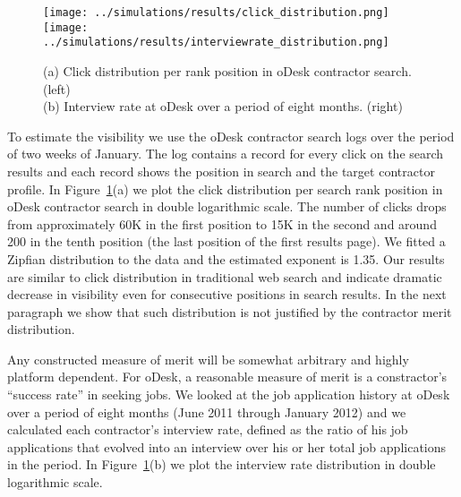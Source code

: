 \documentclass[prodmode,acmec]{acmsmall}
\begin{document}
%
%
\begin{figure}[t]
  \texttt{[image: ../simulations/results/click\_distribution.png]}
  \texttt{[image: ../simulations/results/interviewrate\_distribution.png]}
  \caption{(a) Click distribution per rank position in oDesk contractor
    search. (left)\\ (b) Interview rate at oDesk over a period of eight months. (right)}
  \label{fig:clicks}
\end{figure}
To estimate the visibility we use the oDesk contractor search logs
over the period of two weeks of January. The log contains a record for
every click on the search results and each record shows the position
in search and the target contractor profile. In
Figure~\ref{fig:clicks}(a) we plot the click distribution per search
rank position in oDesk contractor search in double logarithmic
scale. The number of clicks drops from approximately 60K in the first
position to 15K in the second and around 200 in the tenth position
(the last position of the first results page). We fitted a Zipfian
distribution to the data and the estimated exponent is 1.35. Our
results are similar to click distribution in traditional web search
\cite{ali2007robust} and indicate dramatic decrease in visibility even
for consecutive positions in search results. In the next paragraph we
show that such distribution is not justified by the contractor merit
distribution.


Any constructed measure of merit will be somewhat arbitrary and highly
platform dependent. For oDesk, a reasonable measure of merit is a
constractor's ``success rate'' in seeking jobs. We looked at the job
application history at oDesk over a period of eight months (June 2011
through January 2012) and we calculated each contractor's interview
rate, defined as the ratio of his job applications that evolved into
an interview over his or her total job applications in the period. In
Figure~\ref{fig:clicks}(b) we plot the interview rate distribution in
double logarithmic scale.
\end{document}
